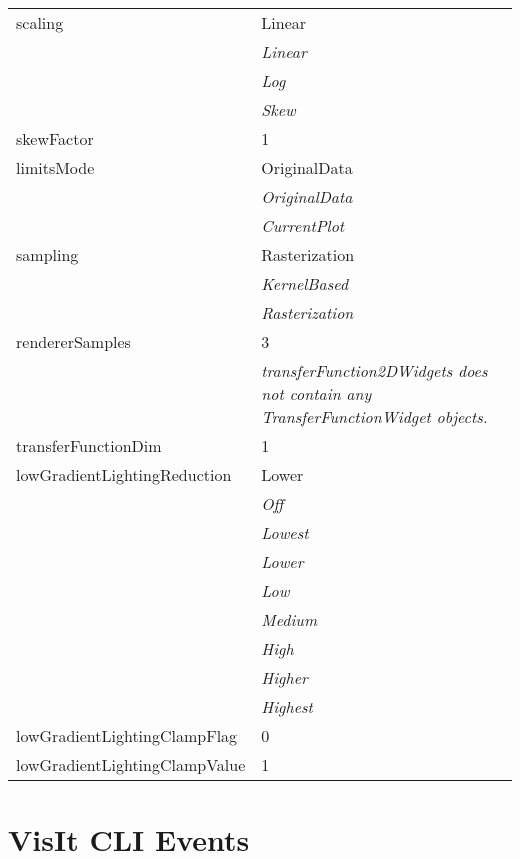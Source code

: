\documentclass[10pt,a4paper]{report}
\begin{document}
\begin{longtable}{lp{7.5cm}}
scaling  &  Linear   \\
 & {\it  Linear} \\
 & {\it  Log} \\
 & {\it  Skew} \\
skewFactor  &  1 \\
limitsMode  &  OriginalData   \\
 & {\it  OriginalData} \\
 & {\it  CurrentPlot} \\
sampling  &  Rasterization   \\
 & {\it  KernelBased} \\
 & {\it  Rasterization} \\
rendererSamples  &  3 \\
 & {\it transferFunction2DWidgets does not contain any TransferFunctionWidget objects.} \\
transferFunctionDim  &  1 \\
lowGradientLightingReduction  &  Lower   \\
 & {\it  Off} \\
 & {\it  Lowest} \\
 & {\it  Lower} \\
 & {\it  Low} \\
 & {\it  Medium} \\
 & {\it  High} \\
 & {\it  Higher} \\
 & {\it  Highest} \\
lowGradientLightingClampFlag  &  0 \\
lowGradientLightingClampValue  &  1 \\
\end{longtable}

\newpage
\newpage
\chapter{VisIt CLI Events}

\end{document}
